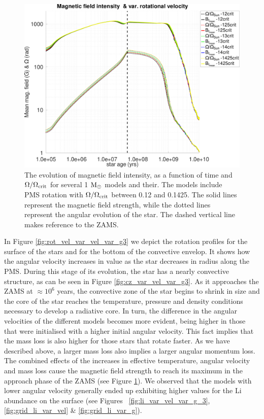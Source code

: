 \documentclass[fleqn,usenatbib]{mnras}
\begin{document}
\begin{figure}
	\includegraphics[clip,width=\columnwidth]{figures/paper2/mag_field_var_vel_g3.pdf}
    \caption{The evolution of magnetic field intensity, as a function of time and $\Omega / \Omega_{\mathrm{crit}}$ for several 1 $\mathrm{M}_\odot$ models and their. The models include PMS rotation with $\Omega / \Omega_{\mathrm{crit}}$ between 0.12 and 0.1425. The solid lines represent the magnetic field strength, while the dotted lines represent the angular evolution of the star. The dashed vertical line makes reference to the ZAMS.}
    \label{fig:mag_field_var_vel_g3}
\end{figure}


In Figure \ref{fig:rot_vel_var_vel_var_g3} we depict the rotation profiles for the surface of the stars and for the bottom of the convective envelop. It shows how the angular velocity increases in value as the star decreases in radius along the PMS. During this stage of its evolution, the star has a nearly convective structure, as can be seen in Figure \ref{fig:cz_var_vel_var_g3}. As it approaches the ZAMS at $\approx 10^6$ years, the convective zone of the star begins to shrink in size and the core of the star reaches the temperature, pressure and density conditions necessary to develop a radiative core. In turn, the difference in the angular velocities of the different models becomes more evident, being higher in those that were initialised with a higher initial angular velocity. This fact implies that the mass loss is also higher for those stars that rotate faster. As we have described above, a larger mass loss also implies a larger angular momentum loss. The combined effects of the increases in effective temperature, angular velocity and mass loss cause the magnetic field strength to reach its maximum in the approach phase of the ZAMS (see Figure \ref{fig:mag_field_var_vel_g3}). We observed that the models with lower angular velocity generally ended up exhibiting higher values for the Li abundance on the surface (see Figures~ \ref{fig:li_var_vel_var_g_3}, \ref{fig:grid_li_var_vel} \& \ref{fig:grid_li_var_g}).\par
\end{document}
